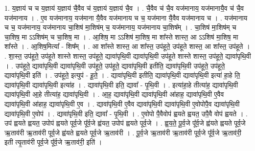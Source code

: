 \documentclass[17pt]{extarticle}
\begin{document}
1. य॒ज्ञाय॑ च च य॒ज्ञाय॑ य॒ज्ञाय॑ चै॒वैव च॑ य॒ज्ञाय॑ य॒ज्ञाय॑ चै॒व । . चै॒वैव च॑ चै॒व यज॑मानाय॒ यज॑मानायै॒व च॑ चै॒व यज॑मानाय । . ए॒व यज॑मानाय॒ यज॑माना यै॒वैव यज॑मानाय च च॒ यज॑माना यै॒वैव यज॑मानाय च । . यज॑मानाय च च॒ यज॑मानाय॒ यज॑मानाय चा॒शिष॑ मा॒शिष॑म् च॒ यज॑मानाय॒ यज॑मानाय चा॒शिष᳚म् । . चा॒शिष॑ मा॒शिष॑म् च चा॒शिष॒ मा ऽऽशिष॑म् च चा॒शिष॒ मा । . आ॒शिष॒ मा ऽऽशिष॑ मा॒शिष॒ मा शा᳚स्ते शास्त॒ आ ऽऽशिष॑ मा॒शिष॒ मा शा᳚स्ते । . आ॒शिष॒मित्या᳚ - शिष᳚म् । . आ शा᳚स्ते शास्त॒ आ शा᳚स्त॒ उप॑हूते॒ उप॑हूते शास्त॒ आ शा᳚स्त॒ उप॑हूते । . शा॒स्त॒ उप॑हूते॒ उप॑हूते शास्ते शास्त॒ उप॑हूते॒ द्यावा॑पृथि॒वी द्यावा॑पृथि॒वी उप॑हूते शास्ते शास्त॒ उप॑हूते॒ द्यावा॑पृथि॒वी । . उप॑हूते॒ द्यावा॑पृथि॒वी द्यावा॑पृथि॒वी उप॑हूते॒ उप॑हूते॒ द्यावा॑पृथि॒वी इतीति॒ द्यावा॑पृथि॒वी उप॑हूते॒ उप॑हूते॒ द्यावा॑पृथि॒वी इति॑ । . उप॑हूते॒ इत्युप॑ - हू॒ते॒ । . द्यावा॑पृथि॒वी इतीति॒ द्यावा॑पृथि॒वी द्यावा॑पृथि॒वी इत्या॑ हा॒हे ति॒ द्यावा॑पृथि॒वी द्यावा॑पृथि॒वी इत्या॑ह । . द्यावा॑पृथि॒वी इति॒ द्यावा᳚ - पृ॒थि॒वी । . इत्या॑हा॒हे तीत्या॑ह॒ द्यावा॑पृथि॒वी द्यावा॑पृथि॒वी आ॒हे तीत्या॑ह॒ द्यावा॑पृथि॒वी । . आ॒ह॒ द्यावा॑पृथि॒वी द्यावा॑पृथि॒वी आ॑हाह॒ द्यावा॑पृथि॒वी ए॒वैव द्यावा॑पृथि॒वी आ॑हाह॒ द्यावा॑पृथि॒वी ए॒व । . द्यावा॑पृथि॒वी ए॒वैव द्यावा॑पृथि॒वी द्यावा॑पृथि॒वी ए॒वोपोपै॒व द्यावा॑पृथि॒वी द्यावा॑पृथि॒वी ए॒वोप॑ । . द्यावा॑पृथि॒वी इति॒ द्यावा᳚ - पृ॒थि॒वी । . ए॒वोपो पै॒वैवोप॑ ह्वयते ह्वयत॒ उपै॒वै वोप॑ ह्वयते । . उप॑ ह्वयते ह्वयत॒ उपोप॑ ह्वयते पूर्व॒जे पू᳚र्व॒जे ह्व॑यत॒ उपोप॑ ह्वयते पूर्व॒जे । . ह्व॒य॒ते॒ पू॒र्व॒जे पू᳚र्व॒जे ह्व॑यते ह्वयते पूर्व॒जे ऋ॒ताव॑री ऋ॒ताव॑री पूर्व॒जे ह्व॑यते ह्वयते पूर्व॒जे ऋ॒ताव॑री । . पू॒र्व॒जे ऋ॒ताव॑री ऋ॒ताव॑री पूर्व॒जे पू᳚र्व॒जे ऋ॒ताव॑री॒ इती त्यृ॒ताव॑री पूर्व॒जे पू᳚र्व॒जे ऋ॒ताव॑री॒ इति॑ । \newline
\end{document}
